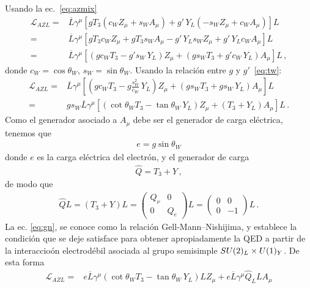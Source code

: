 \begin{frame}
Usando la ec.~\eqref{eq:azmix}
\begin{align}
   \mathcal{L}_{A Z L}=&\overline{L}\gamma^\mu\left[g T_3(c_W Z_\mu+s_W A_\mu)+g'\,Y_L(-s_W Z_\mu+c_W A_\mu)\right]L\nonumber\\
     =&\overline{L}\gamma^\mu\left[g T_3c_W Z_\mu+g T_3s_W A_\mu-g'\,Y_Ls_W Z_\mu+g'\,Y_Lc_W A_\mu\right]L\nonumber\\
    =&\overline{L}\gamma^\mu\left[\left(g c_WT_3-g's_W\,Y_L\right)Z_\mu
       +\left(g s_W T_3+g'c_W\,Y_L\right) A_\mu\right]L\,,
\end{align}
donde $c_W=\cos\theta_W$, $s_W=\sin\theta_W$. Usando la relación entre $g$ y $g'$~\eqref{eq:tw}:
\begin{align}
    \mathcal{L}_{A Z L}=&\overline{L}\gamma^\mu\left[\left(g c_WT_3-g \frac{s_W^2}{c_W}\,Y_L\right)Z_\mu
       +\left(g s_W T_3+g s_W\,Y_L\right) A_\mu\right]L\nonumber\\
=&g s_W\overline{L}\gamma^\mu\left[\left(\cot\theta_WT_3- \tan\theta_W\,Y_L\right)Z_\mu
       +\left(T_3+Y_L\right) A_\mu\right]L\,.
\end{align}
Como el generador asociado a $A_\mu$ debe ser el generador de carga eléctrica, tenemos que
\begin{align}
  e=g\sin\theta_W
\end{align}
donde $e$ es la carga eléctrica del electrón, y el generador de carga
\begin{align}
\label{eq:gn}
  \widehat{Q}=T_3+Y\,,
\end{align}
de modo que
\begin{align}
  \widehat{Q}L=(T_3+Y)L=
  \begin{pmatrix}
    Q_\nu & 0\\
    0  & Q_e
  \end{pmatrix}L=  \begin{pmatrix}
    0 & 0\\
    0  & -1
  \end{pmatrix}L
\,.
\end{align}
La ec. \eqref{eq:gn}, se conoce como la relación Gell-Mann--Nishijima, y establece la condición que se deje satisface para obtener apropiadamente la QED a partir de la interaccioón electrodébil asociada al grupo semisimple $SU(2)_L\times  U(1)_Y$.
De esta forma
\begin{align}
    \mathcal{L}_{A Z L}
=&e\overline{L}\gamma^\mu\left(\cot\theta_W T_3-\tan\theta_W\,Y_L\right)L Z_\mu
       +e\overline{L}\gamma^\mu \widehat{Q}_L L A_\mu\nonumber\\

\end{align}
\end{frame}
